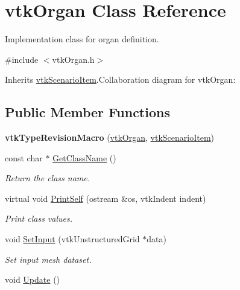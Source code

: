 \hypertarget{classvtkOrgan}{
\section{vtkOrgan Class Reference}
\label{classvtkOrgan}
}


Implementation class for organ definition.  


{\ttfamily \#include $<$vtkOrgan.h$>$}

Inherits \hyperlink{classvtkScenarioItem}{vtkScenarioItem}.Collaboration diagram for vtkOrgan:\subsection*{Public Member Functions}
\begin{DoxyCompactItemize}
\item 
\hypertarget{classvtkOrgan_aaaf057c35a17a65fa1c95f8cfb6d86f2}{
{\bfseries vtkTypeRevisionMacro} (\hyperlink{classvtkOrgan}{vtkOrgan}, \hyperlink{classvtkScenarioItem}{vtkScenarioItem})}
\label{classvtkOrgan_aaaf057c35a17a65fa1c95f8cfb6d86f2}

\item 
\hypertarget{classvtkOrgan_a5938d264f154f3a9357388f809bb3914}{
const char $\ast$ \hyperlink{classvtkOrgan_a5938d264f154f3a9357388f809bb3914}{GetClassName} ()}
\label{classvtkOrgan_a5938d264f154f3a9357388f809bb3914}

\begin{DoxyCompactList}\small\item\em Return the class name. \item\end{DoxyCompactList}\item 
\hypertarget{classvtkOrgan_ad4f07f094056b7161bcdf4edec7f82d2}{
virtual void \hyperlink{classvtkOrgan_ad4f07f094056b7161bcdf4edec7f82d2}{PrintSelf} (ostream \&os, vtkIndent indent)}
\label{classvtkOrgan_ad4f07f094056b7161bcdf4edec7f82d2}

\begin{DoxyCompactList}\small\item\em Print class values. \item\end{DoxyCompactList}\item 
void \hyperlink{classvtkOrgan_abfe750f8e4ec9bbd0b9f182894bf2c97}{SetInput} (vtkUnstructuredGrid $\ast$data)
\begin{DoxyCompactList}\small\item\em Set input mesh dataset. \item\end{DoxyCompactList}\item 
\hypertarget{classvtkOrgan_a267da8ba8d4cfcef50b70dc5b9d19ae9}{
void \hyperlink{classvtkOrgan_a267da8ba8d4cfcef50b70dc5b9d19ae9}{Update} ()}
\label{classvtkOrgan_a267da8ba8d4cfcef50b70dc5b9d19ae9}


\end{DoxyCompactItemize}
